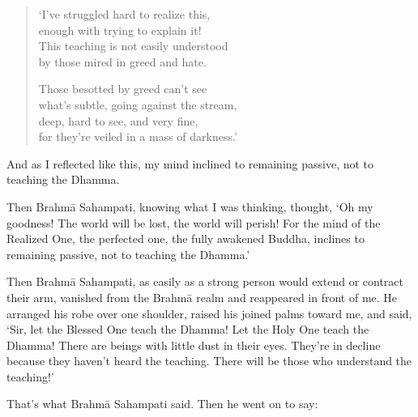 \documentclass[12pt,openany]{book}%
\begin{document}
\begin{verse}%
‘I’ve struggled hard to realize this, \\
enough with trying to explain it! \\
This teaching is not easily understood \\
by those mired in greed and hate. 

Those besotted by greed can’t see \\
what’s subtle, going against the stream, \\
deep, hard to see, and very fine, \\
for they’re veiled in a mass of darkness.’ 

%
\end{verse}

And as I reflected like this, my mind inclined to remaining passive, not to teaching the Dhamma. 

Then \textsanskrit{Brahmā} Sahampati, knowing what I was thinking, thought, ‘Oh my goodness! The world will be lost, the world will perish! For the mind of the Realized One, the perfected one, the fully awakened Buddha, inclines to remaining passive, not to teaching the Dhamma.’ 

Then \textsanskrit{Brahmā} Sahampati, as easily as a strong person would extend or contract their arm, vanished from the \textsanskrit{Brahmā} realm and reappeared in front of me. He arranged his robe over one shoulder, raised his joined palms toward me, and said, ‘Sir, let the Blessed One teach the Dhamma! Let the Holy One teach the Dhamma! There are beings with little dust in their eyes. They’re in decline because they haven’t heard the teaching. There will be those who understand the teaching!’ 

That’s what \textsanskrit{Brahmā} Sahampati said. Then he went on to say: 
\end{document}
